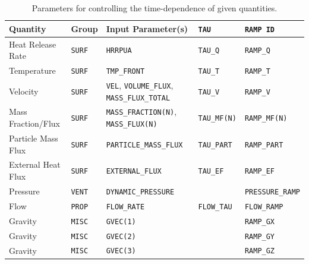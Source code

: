 \documentclass[11pt]{book}
\newcommand{\ct}{\tt\small}
\begin{document}
\begin{table}[ht]
\label{tau_table}
\caption[Parameters used to control time-dependence.]{Parameters for controlling the time-dependence of given quantities.}
\begin{tabular}{|l|l|l|l|l|}
\hline
Quantity            & Group             & Input Parameter(s)                                            & {\ct TAU}                         & {\ct RAMP ID}              \\ \hline \hline
Heat Release Rate   & {\ct SURF}        & {\ct HRRPUA}                                                  & {\ct TAU\_Q}                      & {\ct RAMP\_Q}              \\ \hline
Temperature         & {\ct SURF}        & {\ct TMP\_FRONT}                                              & {\ct TAU\_T}                      & {\ct RAMP\_T}              \\ \hline
Velocity            & {\ct SURF}        & {\ct VEL}, {\ct VOLUME\_FLUX}, {\ct MASS\_FLUX\_TOTAL}        & {\ct TAU\_V}                      & {\ct RAMP\_V}              \\ \hline
Mass Fraction/Flux  & {\ct SURF}        & {\ct MASS\_FRACTION(N)}, {\ct MASS\_FLUX(N)}                  & {\ct TAU\_MF(N)}                  & {\ct RAMP\_MF(N)}          \\ \hline
Particle Mass Flux  & {\ct SURF}        & {\ct PARTICLE\_MASS\_FLUX}                                    & {\ct TAU\_PART}                   & {\ct RAMP\_PART}           \\ \hline
External Heat Flux  & {\ct SURF}        & {\ct EXTERNAL\_FLUX}                                          & {\ct TAU\_EF}                     & {\ct RAMP\_EF}             \\ \hline
Pressure            & {\ct VENT}        & {\ct DYNAMIC\_PRESSURE}                                       &                                   & {\ct PRESSURE\_RAMP}       \\ \hline
Flow                & {\ct PROP}        & {\ct FLOW\_RATE}                                              & {\ct FLOW\_TAU}                   & {\ct FLOW\_RAMP}           \\ \hline
Gravity             & {\ct MISC}        & {\ct GVEC(1)}                                                 &                                   & {\ct RAMP\_GX}             \\ \hline
Gravity             & {\ct MISC}        & {\ct GVEC(2)}                                                 &                                   & {\ct RAMP\_GY}             \\ \hline
Gravity             & {\ct MISC}        & {\ct GVEC(3)}                                                 &                                   & {\ct RAMP\_GZ}             \\ \hline
\end{tabular}
\end{table}
\end{document}
